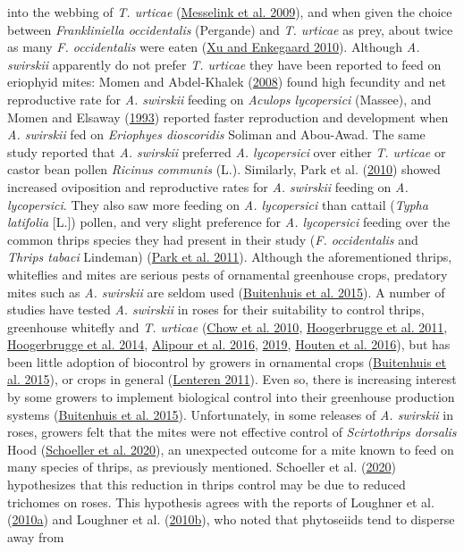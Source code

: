 \documentclass{ufdissertation}[overrideChapters] %
\begin{document}
{into the webbing of \emph{T. urticae} (\protect\hyperlink{ref-Messelink2009}{Messelink et al. 2009}), and when given the choice between \emph{Frankliniella occidentalis} (Pergande) and \emph{T. urticae} as prey, about twice as many \emph{F. occidentalis} were eaten (\protect\hyperlink{ref-Xu2010}{Xu and Enkegaard 2010}). Although \emph{A. swirskii} apparently do not prefer \emph{T. urticae} they have been reported to feed on eriophyid mites: Momen and Abdel-Khalek (\protect\hyperlink{ref-Momen2008}{2008}) found high fecundity and net reproductive rate for \emph{A. swirskii} feeding on \emph{Aculops lycopersici} (Massee), and Momen and Elsaway (\protect\hyperlink{ref-Momen1993}{1993}) reported faster reproduction and development when \emph{A. swirskii} fed on \emph{Eriophyes dioscoridis} Soliman and Abou-Awad. The same study reported that \emph{A. swirskii} preferred \emph{A. lycopersici} over either \emph{T. urticae} or castor bean pollen \emph{Ricinus communis} (L.). Similarly, Park et al. (\protect\hyperlink{ref-Park2010}{2010}) showed increased oviposition and reproductive rates for \emph{A. swirskii} feeding on \emph{A. lycopersici}. They also saw more feeding on \emph{A. lycopersici} than cattail (\emph{Typha latifolia} {[}L.{]}) pollen, and very slight preference for \emph{A. lycopersici} feeding over the common thrips species they had present in their study (\emph{F. occidentalis} and \emph{Thrips tabaci} Lindeman) (\protect\hyperlink{ref-Park2011}{Park et al. 2011}). Although the aforementioned thrips, whiteflies and mites are serious pests of ornamental greenhouse crops, predatory mites such as \emph{A. swirskii} are seldom used (\protect\hyperlink{ref-Buitenhuis2015}{Buitenhuis et al. 2015}). A number of studies have tested \emph{A. swirskii} in roses for their suitability to control thrips, greenhouse whitefly and \emph{T. urticae} (\protect\hyperlink{ref-Chow2010}{Chow et al. 2010}, \protect\hyperlink{ref-Hoogerbrugge2011}{Hoogerbrugge et al. 2011}, \protect\hyperlink{ref-Hoogerbrugge2014}{Hoogerbrugge et al. 2014}, \protect\hyperlink{ref-Alipour2016}{Alipour et al. 2016}, \protect\hyperlink{ref-Alipour2019}{2019}, \protect\hyperlink{ref-Houten2016}{Houten et al. 2016}), but has been little adoption of biocontrol by growers in ornamental crops (\protect\hyperlink{ref-Buitenhuis2015}{Buitenhuis et al. 2015}), or crops in general (\protect\hyperlink{ref-Lenteren2011}{Lenteren 2011}). Even so, there is increasing interest by some growers to implement biological control into their greenhouse production systems (\protect\hyperlink{ref-Buitenhuis2015}{Buitenhuis et al. 2015}). Unfortunately, in some releases of \emph{A. swirskii} in roses, growers felt that the mites were not effective control of \emph{Scirtothrips dorsalis} Hood (\protect\hyperlink{ref-Schoeller2020}{Schoeller et al. 2020}), an unexpected outcome for a mite known to feed on many species of thrips, as previously mentioned. Schoeller et al. (\protect\hyperlink{ref-Schoeller2020}{2020}) hypothesizes that this reduction in thrips control may be due to reduced trichomes on roses. This hypothesis agrees with the reports of Loughner et al. (\protect\hyperlink{ref-Loughner2010}{2010a}) and Loughner et al. (\protect\hyperlink{ref-Loughner2010a}{2010b}), who noted that phytoseiids tend to disperse away from }
\end{document}
